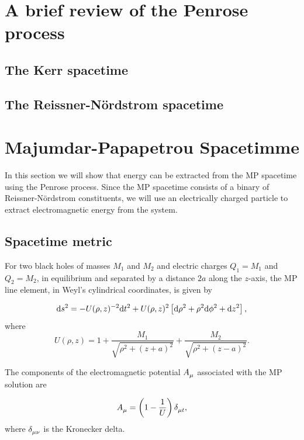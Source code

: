 \section{A brief review of the Penrose process}
\subsection{The Kerr spacetime}
\subsection{The Reissner-N\"ordstrom spacetime}

\section{Majumdar-Papapetrou Spacetimme}

In this section we will show that energy can be extracted from the MP spacetime using the Penrose process. Since the MP spacetime consists of a binary of Reissner-N\"ordstrom constituents, we will use an electrically charged particle to extract electromagnetic energy from the system.

\subsection{Spacetime metric}

For two black holes of masses $M_1$ and $M_2$ and electric charges $Q_1 = M_1$ and $Q_2 = M_2$, in equilibrium and separated by a distance $2a$ along the $z$-axis, the MP line element, in Weyl's cylindrical coordinates, is given by~\cite{SMERAK2016}

\begin{equation}
  \mathrm{d} s^2 = -U(\rho,z)^{-2} \mathrm{d} t^2 + U(\rho,z)^2\left[\mathrm{d}\rho^2 + \rho^2\mathrm{d}\phi^2 + \mathrm{d} z^2\right],
  \label{ch:penrose_binaries/ch:penrose_binaries/eq:majumdar_papapetrou_line_element}
\end{equation}
%
where
\begin{equation}
  U(\rho,z) = 1 + \frac{M_1}{\sqrt{\rho^2 + (z+a)^2}} + \frac{M_2}{\sqrt{\rho^2 + (z-a)^2}}.
  \label{ch:penrose_binaries/eq:mp_metric_potential_cylindric}
\end{equation}

The components of the electromagnetic potential $\tens{A}{}{\mu}$ associated with the MP solution are

\begin{equation}
  \tens{A}{}{\mu} = \left(1 - \frac{1}{U}\right)\tens{\delta}{}{\mu t},
  \label{ch:penrose_binaries/eq:electromagnetic_potential_mp}
\end{equation}
%
where $\tens{\delta}{}{\mu\nu}$ is the Kronecker delta.

